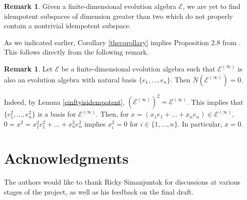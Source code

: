 \documentclass[11pt]{article}
\theoremstyle{definition}
\newtheorem{rem}[thm]{Remark}
\numberwithin{equation}{section}
\begin{document}
\begin{humanblock}
    

\begin{rem} Given a finite-dimensional evolution algebra $\mathcal E$, we are yet to find idempotent subspaces of dimension greater than two which do not properly contain a nontrivial idempotent subspace. 
\end{rem}

As we indicated earlier, Corollary \ref{thecorollary} implies Proposition 2.8 from \cite{HW}. This follows directly from the following remark.

\begin{rem}\label{implicationremark}
    Let $\mathcal E$ be a finite-dimensional evolution algebra such that $\mathcal E^{(\infty)}$ is also an evolution algebra with natural basis $\{e_1,\ldots, e_n\}$. Then $N (\mathcal E^{(\infty)}) = 0$. 
    
    Indeed, by Lemma \ref{einftyisidempotent}, $\left(\mathcal E^{(\infty)}\right)^2 = \mathcal E^{(\infty)}$. This implies that $\{e_1^2,\ldots, e_n^2\}$ is a basis for $\mathcal E^{(\infty)}$. Then, for $x = (x_1e_1 + \ldots+x_n e_n) \in \mathcal E^{(\infty)}$, $0 = x^2 = x_1^2e_1^2 + \ldots +x_n^2 e_n^2$ implies $x_i^2 = 0$ for $i\in \{1,\ldots,n\}$. In particular, $x=0$.  
\end{rem}


\end{humanblock}





\section*{Acknowledgments}

The authors would like to thank Ricky Simanjuntak for discussions at various stages of the project, as well as his feedback on the final draft.






% 
\end{document}
